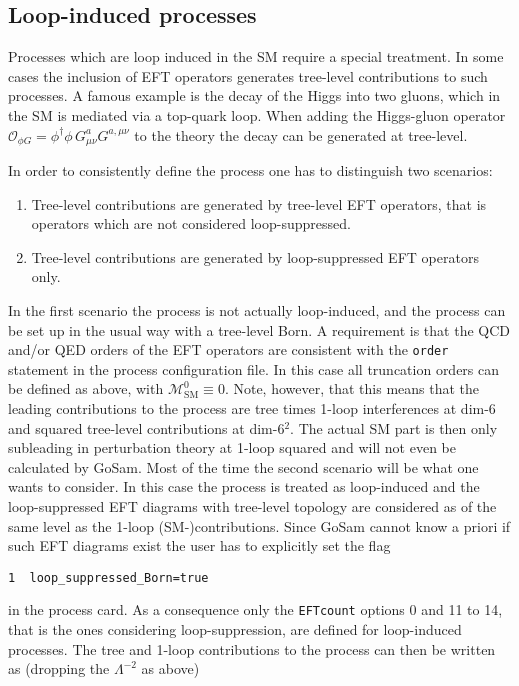 \documentclass[11pt,a4paper]{refrep}
\newcommand{\gosam}{{\sc GoSam}\xspace}
\def\M{\mathcal{M}}
\begin{document}
\subsection{Loop-induced processes}\label{sec:loop-induced}
Processes which are loop induced in the SM require a special treatment. In some cases the inclusion of EFT operators generates tree-level contributions to such processes. A famous example is the decay of the Higgs into two gluons, which in the SM is mediated via a top-quark loop. When adding the Higgs-gluon operator $\mathcal{O}_{\phi G} = \phi^\dagger\phi\,G^a_{\mu\nu}G^{a,\mu\nu}$ to the theory the decay can be generated at tree-level.

In order to consistently define the process one has to distinguish two scenarios:
\begin{enumerate}
   \item Tree-level contributions are generated by tree-level EFT operators, that is operators which are not considered loop-suppressed.
   \item Tree-level contributions are generated by loop-suppressed EFT operators only.
\end{enumerate}
In the first scenario the process is not actually loop-induced, and the process can be set up in the usual way with a tree-level Born. A requirement is that the QCD and/or QED orders of the EFT operators are consistent with the \texttt{order} statement in the process configuration file. In this case all truncation orders can be defined as above, with $\M_\mathrm{SM}^0\equiv0$. Note, however, that this means that the leading contributions to the process are tree times 1-loop interferences at dim-6 and squared tree-level contributions at dim-6$^2$. The actual SM part is then only subleading in perturbation theory at 1-loop squared and will not even be calculated by \gosam. Most of the time the second scenario will be what one wants to consider. In this case the process is treated as loop-induced and the loop-suppressed EFT diagrams with tree-level topology are considered as of the same level as the 1-loop (SM-)contributions. Since \gosam cannot know a priori if such EFT diagrams exist the user has to explicitly set the flag
\begin{lstlisting}[gobble=3,%
     basicstyle=\ttfamily]
1  loop_suppressed_Born=true
\end{lstlisting}
in the process card. As a consequence only the \texttt{EFTcount} options 0 and 11 to 14, that is the ones considering loop-suppression, are defined for loop-induced processes. The tree and 1-loop contributions to the process can then be written as (dropping the $\Lambda^{-2}$ as above)
\end{document}
